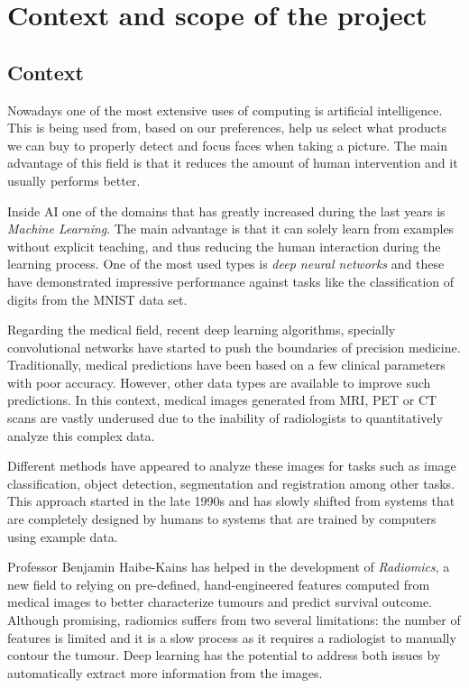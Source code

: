 
\section{Context and scope of the project}
\subsection{Context}

Nowadays one of the most extensive uses of computing is artificial intelligence. This is being
used from, based on our preferences, help us select what products we can buy to properly detect
and focus faces when taking a picture. The main advantage of this field is that it reduces the
amount of human intervention and it usually performs better.

Inside AI one of the domains that has greatly increased during the last years is 
\emph{Machine Learning}. The main advantage is that it can solely learn from examples without 
explicit teaching, and thus reducing the human interaction during the learning process. One of the 
most used types is \emph{deep neural networks} and these have demonstrated impressive performance 
against tasks like the classification of digits from the MNIST data set.
~\cites{MNIST}{empirical-evaluation-deep-architectures}

Regarding the medical field, recent deep learning algorithms, specially convolutional networks 
have started to push the boundaries of precision medicine. 
Traditionally, medical predictions have been based on a few clinical parameters with poor accuracy.
However, other data types are available to improve such predictions. In this context, medical
images generated from MRI, PET or CT scans are vastly underused due to the inability of radiologists
to quantitatively analyze this complex data.

Different methods have appeared to analyze these images for tasks such as
image classification, object detection, segmentation and registration among other tasks. This
approach started in the late 1990s and has slowly shifted from systems that are completely designed
by humans to systems that are trained by computers using example data. 
~\cite{survey-deep-learning}

Professor Benjamin Haibe-Kains has helped in the development of \emph{Radiomics}, a new field to
relying on pre-defined, hand-engineered features computed from medical images to better 
characterize tumours and predict survival outcome. Although promising, radiomics suffers from 
two several limitations: the number of features is limited and it is a slow process as it requires
a radiologist to manually contour the tumour. Deep learning has the potential to address both issues
by automatically extract more information from the images.
~\cite{radiomics-ML-classifiers}


